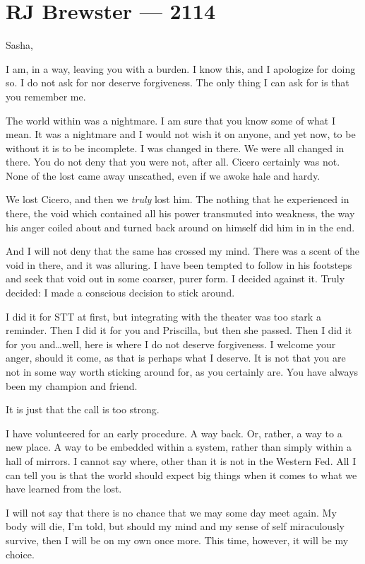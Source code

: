 \hypertarget{rj-brewster-2114}{%
\chapter*{RJ Brewster — 2114}\label{rj-brewster-2114}}

Sasha,

I am, in a way, leaving you with a burden. I know this, and I apologize for doing so. I do not ask for nor deserve forgiveness. The only thing I can ask for is that you remember me.

The world within was a nightmare. I am sure that you know some of what I mean. It was a nightmare and I would not wish it on anyone, and yet now, to be without it is to be incomplete. I was changed in there. We were all changed in there. You do not deny that you were not, after all. Cicero certainly was not. None of the lost came away unscathed, even if we awoke hale and hardy.

We lost Cicero, and then we \emph{truly} lost him. The nothing that he experienced in there, the void which contained all his power transmuted into weakness, the way his anger coiled about and turned back around on himself did him in in the end.

And I will not deny that the same has crossed my mind. There was a scent of the void in there, and it was alluring. I have been tempted to follow in his footsteps and seek that void out in some coarser, purer form. I decided against it. Truly decided: I made a conscious decision to stick around.

I did it for STT at first, but integrating with the theater was too stark a reminder. Then I did it for you and Priscilla, but then she passed. Then I did it for you and\ldots{}well, here is where I do not deserve forgiveness. I welcome your anger, should it come, as that is perhaps what I deserve. It is not that you are not in some way worth sticking around for, as you certainly are. You have always been my champion and friend.

It is just that the call is too strong.

I have volunteered for an early procedure. A way back. Or, rather, a way to a new place. A way to be embedded within a system, rather than simply within a hall of mirrors. I cannot say where, other than it is not in the Western Fed. All I can tell you is that the world should expect big things when it comes to what we have learned from the lost.

I will not say that there is no chance that we may some day meet again. My body will die, I'm told, but should my mind and my sense of self miraculously survive, then I will be on my own once more. This time, however, it will be my choice.

